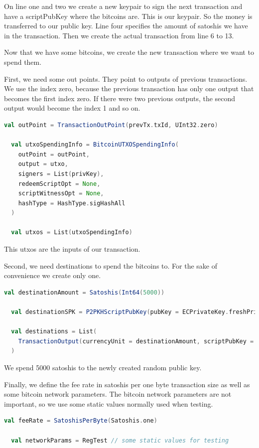 On line one and two we create a new keypair to sign the next transaction and have a scriptPubKey where the bitcoins are.
This is our keypair.
So the money is transferred to our public key.
Line four specifies the amount of satoshis we have in the transaction.
Then we create the actual transaction from line 6 to 13.

Now that we have some bitcoins, we create the new transaction where we want to spend them.

First, we need some out points.
They point to outputs of previous transactions.
We use the index zero, because the previous transaction has only one output that becomes the first index zero.
If there were two previous outputs, the second output would become the index 1 and so on.
\begin{lstlisting}[language=scala]
  val outPoint = TransactionOutPoint(prevTx.txId, UInt32.zero)

  val utxoSpendingInfo = BitcoinUTXOSpendingInfo(
    outPoint = outPoint,
    output = utxo,
    signers = List(privKey),
    redeemScriptOpt = None,
    scriptWitnessOpt = None,
    hashType = HashType.sigHashAll
  )

  val utxos = List(utxoSpendingInfo)
\end{lstlisting}

This utxos are the inputs of our transaction.

Second, we need destinations to spend the bitcoins to.
For the sake of convenience we create only one.
\begin{lstlisting}[language=scala]
  val destinationAmount = Satoshis(Int64(5000))

  val destinationSPK = P2PKHScriptPubKey(pubKey = ECPrivateKey.freshPrivateKey.publicKey)

  val destinations = List(
    TransactionOutput(currencyUnit = destinationAmount, scriptPubKey = destinationSPK)
  )
\end{lstlisting}

We spend 5000 satoshis to the newly created random public key.

Finally, we define the fee rate in satoshis per one byte transaction size as well as some bitcoin network parameters.
The bitcoin network parameters are not important, so we use some static values normally used when testing.
\begin{lstlisting}[language=scala]
  val feeRate = SatoshisPerByte(Satoshis.one)

  val networkParams = RegTest // some static values for testing
\end{lstlisting}

